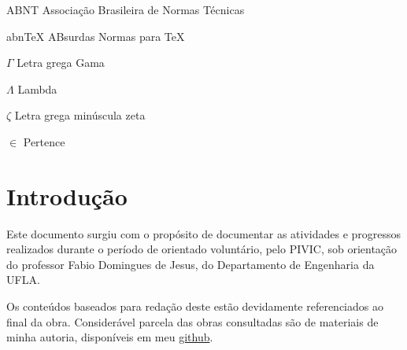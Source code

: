 \documentclass[
12pt,				%
openany,			%
twoside,			%
a4paper,			%
english,			%
french,				%
spanish,			%
brazil,				%
]{abntex2}
\begin{document}
\listoffigures*
\cleardoublepage

\listoftables*
\cleardoublepage

\lstlistoflistings
\cleardoublepage

\begin{siglas}
\item[ABNT] Associação Brasileira de Normas Técnicas
\item[abnTeX] ABsurdas Normas para TeX
\end{siglas}

\begin{simbolos}
\item[$ \Gamma $] Letra grega Gama
\item[$ \Lambda $] Lambda
\item[$ \zeta $] Letra grega minúscula zeta
\item[$ \in $] Pertence
\end{simbolos}

\tableofcontents*
\cleardoublepage


\textual

\chapter*[Introdução]{Introdução}
Este documento surgiu com o propósito de documentar as atividades e progressos
realizados durante o período de orientado voluntário, pelo PIVIC, sob orientação
do professor Fabio Domingues de Jesus, do Departamento de Engenharia da UFLA.

Os conteúdos baseados para redação deste estão devidamente referenciados ao final da obra. Considerável parcela
das obras consultadas são de materiais de minha autoria, disponíveis em meu \href{https://github.com/GabrielMMelo/}{github}.
\end{document}
